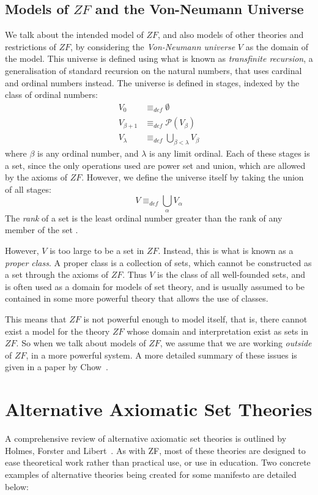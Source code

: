 \documentclass[11pt]{report}
\newcommand{\eqdef}{\equiv_\mathit{def}}
\theoremstyle{definition}
\theoremstyle{theorem}
\theoremstyle{lemma}
\begin{document}
\subsection{Models of $\mathit{ZF}$ and the Von-Neumann Universe}\label{vonneu}
We talk about the intended model of $\mathit{ZF}$, and also models of other theories and restrictions of $ZF$, by considering the \emph{Von-Neumann universe} $V$ as the domain of the model. This universe is defined using what is known as \emph{transfinite recursion}, a generalisation of standard recursion on the natural numbers, that uses cardinal and ordinal numbers instead. The universe is defined in stages, indexed by the class of ordinal numbers:
\begin{align*}
  V_0 &\eqdef \emptyset \\
  V_{\beta+1} &\eqdef \mathcal{P}(V_\beta)\\
  V_{\lambda} &\eqdef \bigcup_{\beta<\lambda} V_\beta
\end{align*}
where $\beta$ is any ordinal number, and $\lambda$ is any limit ordinal.
Each of these stages is a set, since the only operations used are power set and union, which are allowed by the axioms of $\mathit{ZF}$. However, we define the universe itself by taking the union of all stages:
$$V \eqdef \bigcup_\alpha V_\alpha$$
The \emph{rank} of a set is the least ordinal number greater than the rank of any member of the set .

However, $V$ is too large to be a set in $\mathit{ZF}$.
Instead, this is what is known as a \emph{proper class}.
A proper class is a collection of sets, which cannot be constructed as a set through the axioms of $\mathit{ZF}$.
Thus $V$ is the class of all well-founded sets, and is often used as a domain for models of set theory, and is usually assumed to be contained in some more powerful theory that allows the use of classes.

This means that $\mathit{ZF}$ is not powerful enough to model itself, that is, there cannot exist a model for the theory $\mathit{ZF}$ whose domain and interpretation exist as sets in $\mathit{ZF}$.
So when we talk about models of $ZF$, we assume that we are working \emph{outside} of $\mathit{ZF}$, in a more powerful system. A more detailed summary of these issues is given in a paper by Chow~\cite{force}.

\section{Alternative Axiomatic Set Theories}
A comprehensive review of alternative axiomatic set theories is outlined by Holmes, Forster and Libert~\cite{ast}.
As with ZF, most of these theories are designed to ease theoretical work rather than practical use, or use in education.
Two concrete examples of alternative theories being created for some manifesto are detailed below:
\end{document}
